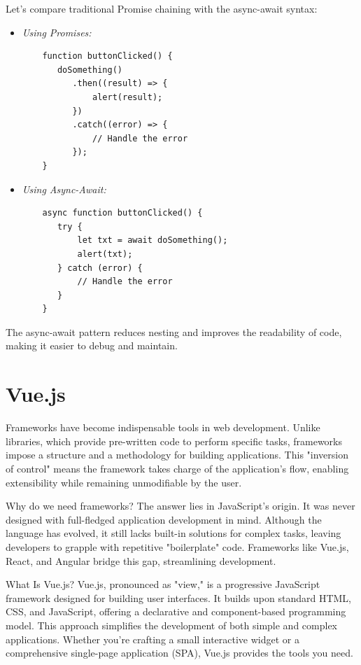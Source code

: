 Let’s compare traditional Promise chaining with the async-await syntax:
\begin{itemize}
    \item \textit{Using Promises:}
    \begin{verbatim}
    function buttonClicked() {
       doSomething()
          .then((result) => {
              alert(result);
          })
          .catch((error) => {
              // Handle the error
          });
    }
    \end{verbatim}
    \item \textit{Using Async-Await:}
    \begin{verbatim}
    async function buttonClicked() {
       try {
           let txt = await doSomething();
           alert(txt);
       } catch (error) {
           // Handle the error
       }
    }
    \end{verbatim}
\end{itemize}
The async-await pattern reduces nesting and improves the readability of code, making it easier to debug and maintain.

\section{Vue.js}
Frameworks have become indispensable tools in web development. Unlike libraries, which provide pre-written code to perform specific tasks, frameworks impose a structure and a methodology for building applications. This "inversion of control" means the framework takes charge of the application's flow, enabling extensibility while remaining unmodifiable by the user.

Why do we need frameworks? The answer lies in JavaScript's origin. It was never designed with full-fledged application development in mind. Although the language has evolved, it still lacks built-in solutions for complex tasks, leaving developers to grapple with repetitive "boilerplate" code. Frameworks like Vue.js, React, and Angular bridge this gap, streamlining development.

What Is Vue.js? Vue.js, pronounced as "view," is a progressive JavaScript framework designed for building user interfaces. It builds upon standard HTML, CSS, and JavaScript, offering a declarative and component-based programming model. This approach simplifies the development of both simple and complex applications. Whether you're crafting a small interactive widget or a comprehensive single-page application (SPA), Vue.js provides the tools you need.

